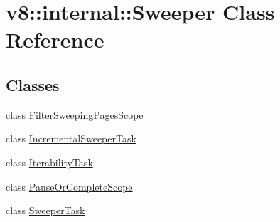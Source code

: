 \hypertarget{classv8_1_1internal_1_1Sweeper}{}\section{v8\+:\+:internal\+:\+:Sweeper Class Reference}
\label{classv8_1_1internal_1_1Sweeper}
\subsection*{Classes}
\begin{DoxyCompactItemize}
\item 
class \mbox{\hyperlink{classv8_1_1internal_1_1Sweeper_1_1FilterSweepingPagesScope}{Filter\+Sweeping\+Pages\+Scope}}
\item 
class \mbox{\hyperlink{classv8_1_1internal_1_1Sweeper_1_1IncrementalSweeperTask}{Incremental\+Sweeper\+Task}}
\item 
class \mbox{\hyperlink{classv8_1_1internal_1_1Sweeper_1_1IterabilityTask}{Iterability\+Task}}
\item 
class \mbox{\hyperlink{classv8_1_1internal_1_1Sweeper_1_1PauseOrCompleteScope}{Pause\+Or\+Complete\+Scope}}
\item 
class \mbox{\hyperlink{classv8_1_1internal_1_1Sweeper_1_1SweeperTask}{Sweeper\+Task}}
\end{DoxyCompactItemize}
